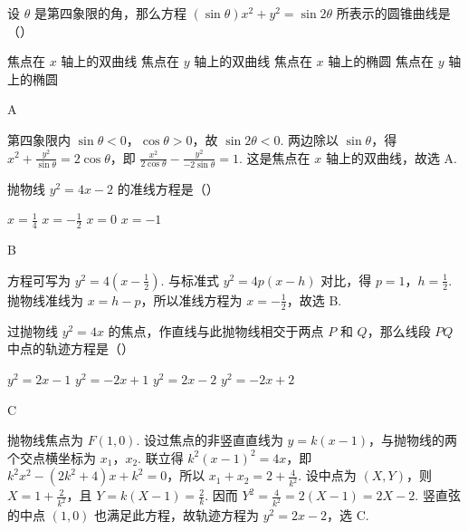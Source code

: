 \begin{problem}
设 \(\theta\) 是第四象限的角，那么方程 \((\sin \theta)x^2 + y^2 = \sin 2\theta\) 所表示的圆锥曲线是（\quad）

\choices
    {焦点在 \(x\) 轴上的双曲线}
    {焦点在 \(y\) 轴上的双曲线}
    {焦点在 \(x\) 轴上的椭圆}
    {焦点在 \(y\) 轴上的椭圆}
\end{problem}

\begin{answer}
A
\end{answer}

\begin{solution}
第四象限内 \(\sin\theta<0\)，\(\cos\theta>0\)，故 \(\sin2\theta<0\). 两边除以 \(\sin\theta\)，得 \(x^2+\frac{y^2}{\sin\theta}=2\cos\theta\)，即 \(\frac{x^2}{2\cos\theta}-\frac{y^2}{-2\sin\theta}=1\). 这是焦点在 \(x\) 轴上的双曲线，故选 A.
\end{solution}

\begin{problem}
抛物线 \(y^2 = 4x - 2\) 的准线方程是（\quad）

\choices
    {\(x = \frac{1}{4}\)}
    {\(x = -\frac{1}{2}\)}
    {\(x = 0\)}
    {\(x = -1\)}
\end{problem}

\begin{answer}
B
\end{answer}

\begin{solution}
方程可写为 \(y^2=4\left(x-\frac12\right)\). 与标准式 \(y^2=4p(x-h)\) 对比，得 \(p=1\)，\(h=\frac12\). 抛物线准线为 \(x=h-p\)，所以准线方程为 \(x=-\frac12\)，故选 B.
\end{solution}

\begin{problem}
过抛物线 \(y^2 = 4x\) 的焦点，作直线与此抛物线相交于两点 \(P\) 和 \(Q\)，那么线段 \(PQ\) 中点的轨迹方程是（\quad）

\choices
    {\(y^2 = 2x - 1\)}
    {\(y^2 = -2x + 1\)}
    {\(y^2 = 2x - 2\)}
    {\(y^2 = -2x + 2\)}
\end{problem}

\begin{answer}
C
\end{answer}

\begin{solution}
抛物线焦点为 \(F(1,0)\). 设过焦点的非竖直直线为 \(y=k(x-1)\)，与抛物线的两个交点横坐标为 \(x_1\)，\(x_2\). 联立得 \(k^2(x-1)^2=4x\)，即 \(k^2x^2-(2k^2+4)x+k^2=0\)，所以 \(x_1+x_2=2+\frac4{k^2}\). 设中点为 \((X,Y)\)，则 \(X=1+\frac2{k^2}\)，且 \(Y=k(X-1)=\frac2k\). 因而 \(Y^2=\frac4{k^2}=2(X-1)=2X-2\). 竖直弦的中点 \((1,0)\) 也满足此方程，故轨迹方程为 \(y^2=2x-2\)，选 C.
\end{solution}

